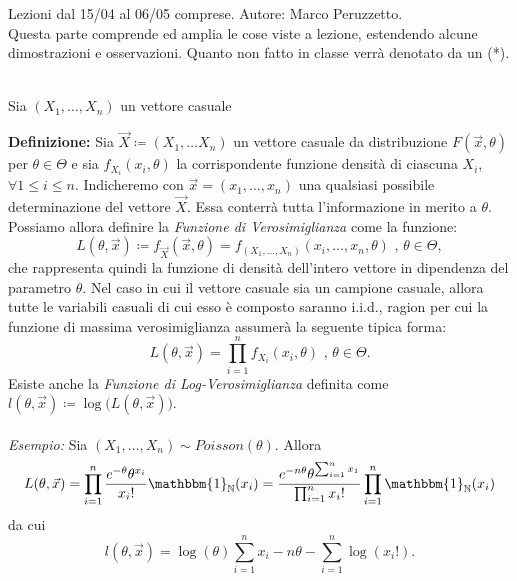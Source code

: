 Lezioni dal 15/04 al 06/05 comprese. Autore: Marco Peruzzetto.\\
Questa parte comprende ed amplia le cose viste a lezione, estendendo alcune dimostrazioni e osservazioni. Quanto non fatto in classe verrà denotato da un (*).\\
\\
\begin{dfn}
  Sia \((X_1,\dotsc,X_n)\) un vettore casuale
\end{dfn}
\textbf{Definizione:} Sia $\vec{X}\coloneqq (X_1,\ldots X_n)$ un vettore casuale da distribuzione $F(\vec{x}, \theta)$ per $\theta\in \Theta$ e sia $f_{X_i}(x_i,\theta)$ la corrispondente funzione densità di ciascuna $X_i$, $\forall 1\leq i\leq n$. Indicheremo con $\vec{x}=(x_1,\ldots,x_n)$ una qualsiasi possibile determinazione del vettore $\vec{X}$. Essa conterrà tutta l'informazione in merito a $\theta$. Possiamo allora definire la \textit{Funzione di Verosimiglianza} come la funzione:
$$L\left(\theta, \vec{x}\right)\coloneqq f_{\vec{X}}(\vec{x},\theta)=f_{(X_1,\ldots,X_n)}(x_i,\ldots,x_n,\theta)\mbox{ , } \theta\in \Theta, $$ che rappresenta quindi la funzione di densità dell'intero vettore in dipendenza del parametro $\theta$. Nel caso in cui il vettore casuale sia un campione casuale, allora tutte le variabili casuali di cui esso è composto saranno i.i.d., ragion per cui la funzione di massima verosimiglianza assumerà la seguente tipica forma:
$$L\left(\theta, \vec{x}\right)=\prod_{i=1}^n f_{X_i}\left(x_i, \theta\right) \mbox{ , } \theta\in \Theta.$$
Esiste anche la \textit{Funzione di Log-Verosimiglianza} definita come $l(\theta,\vec{x})\coloneqq \log\big(L(\theta, \vec{x})\big)$. 
\\ 
\\
\textit{Esempio:} Sia $(X_1,\ldots,X_n)\sim Poisson(\theta)$. Allora $$L(\theta, \vec{x})=\prod_{i=1}^n \frac{e^{-\theta}\theta^{x_i}}{x_i !}\mathbbm{1}_{\mathbb{N}}(x_i)=\frac{e^{-n\theta}\theta^{\sum_{i=1}^n x_1}}{\prod_{i=1}^n x_i !}\prod_{i=1}^n \mathbbm{1}_{\mathbb{N}}(x_i)$$ da cui $$l(\theta, \vec{x})=\log(\theta)\sum_{i=1}^n x_i   -n\theta - \sum_{i=1}^n \log(x_i !).$$ 
\\ \\

